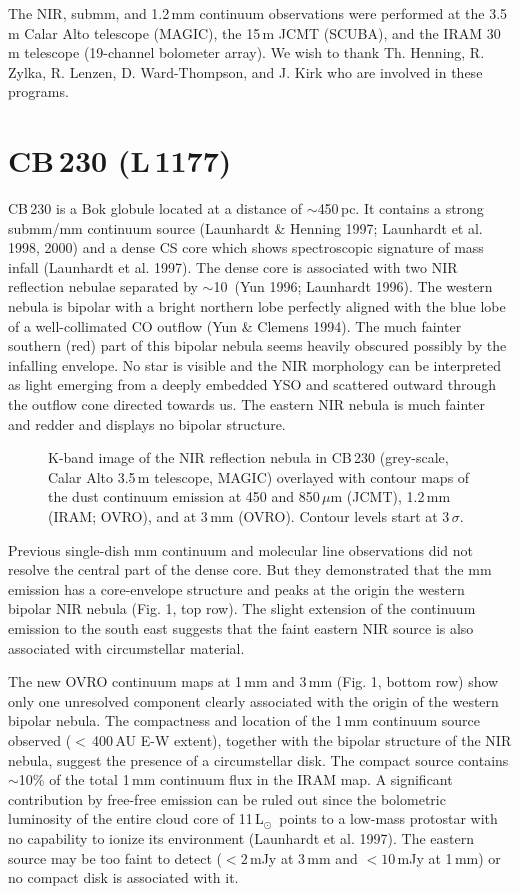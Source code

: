 The NIR, submm, and 1.2\,mm continuum observations were performed 
at the 3.5\,m Calar Alto telescope (MAGIC), the 15\,m JCMT (SCUBA), and 
the IRAM 30\,m telescope (19-channel bolometer array). 
We wish to thank Th. Henning, R. Zylka, R. Lenzen, D. Ward-Thompson, 
and J. Kirk who are involved in these programs.


\section{CB\,230 (L\,1177)}

CB\,230 
is a Bok globule located at a distance of $\sim$450\,pc. 
It contains a strong submm/mm continuum source 
(Launhardt \& Henning 1997; Launhardt et al. 1998, 2000) 
and a dense CS core which shows spectroscopic 
signature of mass infall (Launhardt et al. 1997). 
The dense core is associated with two NIR reflection 
nebulae separated by $\sim$10\arcsec\ 
(Yun 1996; Launhardt 1996). 
The western nebula is bipolar with a bright northern lobe 
perfectly aligned with the blue lobe of 
a well-collimated CO outflow (Yun \& Clemens 1994). 
The much fainter southern (red) part of this bipolar 
nebula seems heavily obscured possibly by the infalling envelope.
No star is visible and  
the NIR morphology can be interpreted as light emerging from a 
deeply embedded YSO and scattered outward through the outflow cone 
directed towards us. 
The eastern NIR nebula is much fainter and redder 
and displays no bipolar structure. 

\begin{figure} 
\caption{\small K-band image of the NIR reflection nebula in CB\,230 (grey-scale, 
Calar Alto 3.5\,m telescope, MAGIC) 
overlayed with contour maps of the dust continuum emission at 
450 and 850\,$\mu$m (JCMT), 
1.2\,mm (IRAM; OVRO), and at 
3\,mm (OVRO).
Contour levels start at 3\,$\sigma$.}
\end{figure}

Previous single-dish mm continuum and molecular line observations did not resolve 
the central part of the dense core. But they demonstrated that the mm emission 
has a core-envelope structure and peaks at the origin the western bipolar NIR 
nebula (Fig. 1, top row). 
The slight extension of the continuum emission to the south east 
suggests that the faint eastern NIR source is also associated with 
circumstellar material. 

The new OVRO continuum maps at 1\,mm and 3\,mm (Fig. 1, bottom row) 
show only one unresolved component clearly associated with the origin 
of the western bipolar nebula. The compactness and location of the 1\,mm continuum source
observed ($<$\,400\,AU E-W extent), together with the bipolar structure 
of the NIR nebula, suggest the presence of a circumstellar disk. The compact source contains 
$\sim$10\% of the total 1\,mm continuum flux in the IRAM map. A significant contribution 
by free-free emission can be ruled out since the bolometric luminosity of the entire 
cloud core of 11\,L$_{\odot}$\ points to a low-mass protostar 
with no capability to ionize its environment (Launhardt et al. 1997). The eastern source 
may be too faint to detect ($< 2$\,mJy at 3\,mm and $< 10$\,mJy at 1\,mm) 
or no compact disk is associated with it. 

